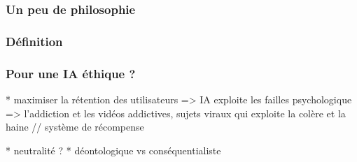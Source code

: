 \subsubsection{Un peu de philosophie}


\subsubsection{Définition}

\subsubsection{Pour une IA éthique ?}
* maximiser la rétention des utilisateurs => IA exploite les failles psychologique => l'addiction et les vidéos addictives, sujets viraux qui exploite la colère et la haine // système de récompense

* neutralité ?
* déontologique vs conséquentialiste
